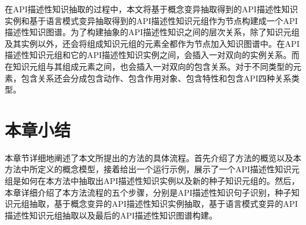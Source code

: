 在API描述性知识抽取的过程中，本文将基于概念变异抽取得到的API描述性知识实例和基于语言模式变异抽取得到的API描述性知识元组作为节点构建成一个API描述性知识图谱。为了构建抽象的API描述性知识之间的层次关系，除了知识元组及其实例以外，还会将组成知识元组的元素全都作为节点加入知识图谱中。在API描述性知识元组和它的API描述性知识实例之间，会插入一对双向的实例关系。而在知识元组与其组成元素之间，也会插入一对双向的包含关系。对于不同类型的元素，包含关系还会分成包含动作、包含作用对象、包含特性和包含API四种关系类型。

\section{本章小结}
本章节详细地阐述了本文所提出的方法的具体流程。首先介绍了方法的概览以及本方法中所定义的概念模型，接着给出一个运行示例，展示了一个API描述性知识元组是如何在本方法中抽取出API描述性知识实例以及新的种子知识元组的。然后，本章详细介绍了本方法流程的五个步骤，分别是API描述性知识句子识别，种子知识元组抽取，基于概念变异的API描述性知识实例抽取，基于语言模式变异的API描述性知识元组抽取以及最后的API描述性知识图谱构建。